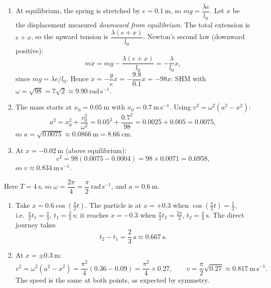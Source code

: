\documentclass[11pt]{article}
\begin{document}
\begin{corrige}
\begin{enumerate}
\item At equilibrium, the spring is stretched by $e = 0.1\ \mathrm{m}$, so $mg = \dfrac{\lambda e}{l_0}$. Let $x$ be the displacement measured \emph{downward from equilibrium}. The total extension is $e + x$, so the upward tension is $\dfrac{\lambda(e+x)}{l_0}$. Newton's second law (downward positive):
\[
m\ddot{x} = mg - \frac{\lambda(e+x)}{l_0} = -\frac{\lambda}{l_0}x,
\]
since $mg = \lambda e/l_0$. Hence $\ddot{x} = -\dfrac{g}{e}x = -\dfrac{9.8}{0.1}x = -98x$: SHM with $\omega = \sqrt{98} = 7\sqrt{2} \approx 9.90\ \mathrm{rad\,s^{-1}}$.
\item The mass starts at $x_0 = 0.05\ \mathrm{m}$ with $\dot{x}_0 = 0.7\ \mathrm{m\,s^{-1}}$. Using $v^2 = \omega^2(a^2 - x^2)$:
\[
a^2 = x_0^2 + \frac{v_0^2}{\omega^2} = 0.05^2 + \frac{0.7^2}{98} = 0.0025 + 0.005 = 0.0075,
\]
so $a = \sqrt{0.0075} \approx 0.0866\ \mathrm{m} = 8.66\ \mathrm{cm}$.
\item At $x = -0.02\ \mathrm{m}$ (above equilibrium):
\[
v^2 = 98\left(0.0075 - 0.0004\right) = 98 \times 0.0071 = 0.6958,
\]
so $v \approx 0.834\ \mathrm{m\,s^{-1}}$.
\end{enumerate}
\end{corrige}

\begin{corrige}
Here $T = 4\ \mathrm{s}$, so $\omega = \dfrac{2\pi}{4} = \dfrac{\pi}{2}\ \mathrm{rad\,s^{-1}}$, and $a = 0.6\ \mathrm{m}$.
\begin{enumerate}
\item Take $x = 0.6\cos\left(\tfrac{\pi}{2}t\right)$. The particle is at $x = +0.3$ when $\cos\left(\tfrac{\pi}{2}t\right) = \tfrac12$, i.e.\ $\tfrac{\pi}{2}t_1 = \tfrac{\pi}{3}$, $t_1 = \tfrac{2}{3}\ \mathrm{s}$; it reaches $x = -0.3$ when $\tfrac{\pi}{2}t_2 = \tfrac{2\pi}{3}$, $t_2 = \tfrac{4}{3}\ \mathrm{s}$. The direct journey takes
\[
t_2 - t_1 = \frac{2}{3}\ \mathrm{s} \approx 0.667\ \mathrm{s}.
\]
\item At $x = \pm 0.3\ \mathrm{m}$:
\[
v^2 = \omega^2(a^2 - x^2) = \frac{\pi^2}{4}(0.36 - 0.09) = \frac{\pi^2}{4}\times 0.27,
\qquad v = \frac{\pi}{2}\sqrt{0.27} \approx 0.817\ \mathrm{m\,s^{-1}}.
\]
The speed is the same at both points, as expected by symmetry.
\end{enumerate}
\end{corrige}
\end{document}

